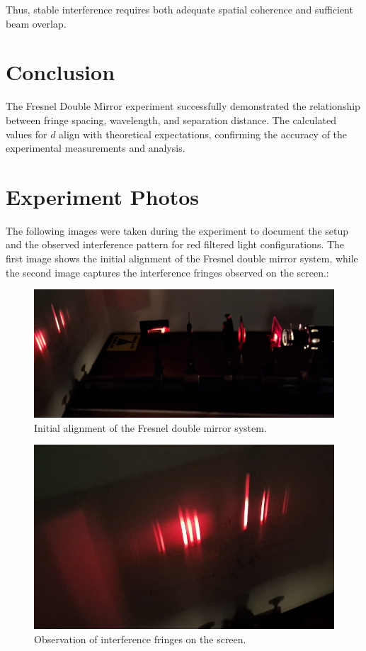 \documentclass[journal]{IEEEtran}
\begin{document}
Thus, stable interference requires both adequate spatial coherence and sufficient beam overlap.

\section{Conclusion}
The Fresnel Double Mirror experiment successfully demonstrated the relationship between fringe spacing, wavelength, and separation distance. The calculated values for $d$ align with theoretical expectations, confirming the accuracy of the experimental measurements and analysis.

\section{Experiment Photos}
The following images were taken during the experiment to document the setup and the observed interference pattern for red filtered light configurations.
The first image shows the initial alignment of the Fresnel double mirror system, while the second image captures the interference fringes observed on the screen.:

\begin{figure}[H]
    \centering
    \includegraphics[width=0.8\linewidth]{../IMAGES/setup_opened.jpg}
    \caption{Initial alignment of the Fresnel double mirror system.}
    \label{fig:photo1}
\end{figure}

\begin{figure}[H]
    \centering
    \includegraphics[width=0.8\linewidth]{../IMAGES/pattern.jpg}
    \caption{Observation of interference fringes on the screen.}
    \label{fig:photo2}
\end{figure}
\end{document}
